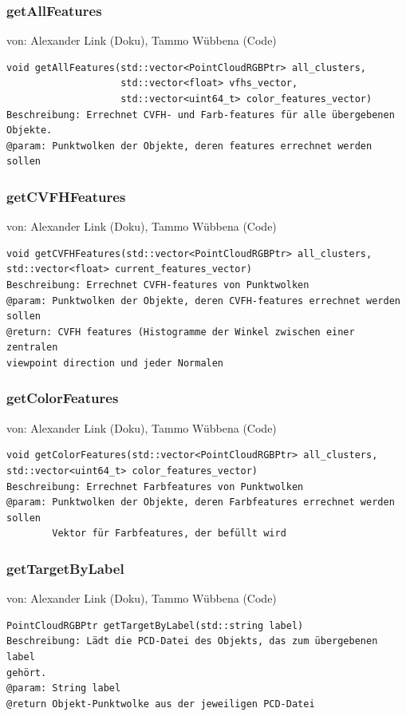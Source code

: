 \documentclass{suturo}
\makeatletter
\newcommand{\chapterauthor}[1]{%
  {\parindent0pt\vspace*{-27pt}%
  \linespread{0}\small\begin{flushright}von: #1\end{flushright}%
  \par\nobreak\vspace*{0pt}}
  \@afterheading%
}
\makeatother
\begin{document}
\subsubsection{getAllFeatures}
\chapterauthor{Alexander Link (Doku), Tammo Wübbena (Code)}
\begin{verbatim}
void getAllFeatures(std::vector<PointCloudRGBPtr> all_clusters,
                    std::vector<float> vfhs_vector,
                    std::vector<uint64_t> color_features_vector)
Beschreibung: Errechnet CVFH- und Farb-features für alle übergebenen Objekte.
@param: Punktwolken der Objekte, deren features errechnet werden sollen
\end{verbatim}\label{func:getallfeatures}

\subsubsection{getCVFHFeatures}
\chapterauthor{Alexander Link (Doku), Tammo Wübbena (Code)}
\begin{verbatim}
void getCVFHFeatures(std::vector<PointCloudRGBPtr> all_clusters,
std::vector<float> current_features_vector)
Beschreibung: Errechnet CVFH-features von Punktwolken
@param: Punktwolken der Objekte, deren CVFH-features errechnet werden sollen
@return: CVFH features (Histogramme der Winkel zwischen einer zentralen
viewpoint direction und jeder Normalen
\end{verbatim}\label{func:getcvfhfeatures}

\subsubsection{getColorFeatures}
\chapterauthor{Alexander Link (Doku), Tammo Wübbena (Code)}
\begin{verbatim}
void getColorFeatures(std::vector<PointCloudRGBPtr> all_clusters,
std::vector<uint64_t> color_features_vector)
Beschreibung: Errechnet Farbfeatures von Punktwolken
@param: Punktwolken der Objekte, deren Farbfeatures errechnet werden sollen
	    Vektor für Farbfeatures, der befüllt wird
\end{verbatim}\label{func:getcolorfeatures}

\subsubsection{getTargetByLabel}
\chapterauthor{Alexander Link (Doku), Tammo Wübbena (Code)}
\begin{verbatim}
PointCloudRGBPtr getTargetByLabel(std::string label)
Beschreibung: Lädt die PCD-Datei des Objekts, das zum übergebenen label
gehört.
@param: String label
@return Objekt-Punktwolke aus der jeweiligen PCD-Datei
\end{verbatim}\label{func:gettargetbylabel}
\end{document}
